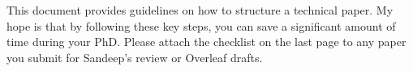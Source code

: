 This document provides guidelines on how to structure a technical paper. 
My hope is that by following these key steps, you can save a significant amount of time
during your PhD. Please attach the checklist on the last page to any paper you submit for Sandeep's review or Overleaf drafts. 
